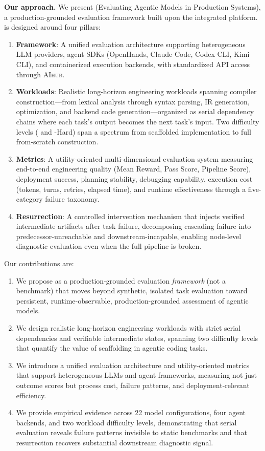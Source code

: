 \textbf{Our approach.}
We present \eva{} (Evaluating Agentic Models in Production Systems), a production-grounded evaluation framework built upon the \yatcc{} integrated platform.
\eva{} is designed around four pillars:
\begin{enumerate}[nosep]
\item \textbf{Framework}: A unified evaluation architecture supporting heterogeneous LLM providers, agent SDKs (OpenHands, Claude Code, Codex CLI, Kimi CLI), and containerized execution backends, with standardized API access through \textsc{AIhub}.
\item \textbf{Workloads}: Realistic long-horizon engineering workloads spanning compiler construction---from lexical analysis through syntax parsing, IR generation, optimization, and backend code generation---organized as serial dependency chains where each task's output becomes the next task's input. Two difficulty levels (\yatcc{} and \yatcc{}-Hard) span a spectrum from scaffolded implementation to full from-scratch construction.
\item \textbf{Metrics}: A utility-oriented multi-dimensional evaluation system measuring end-to-end engineering quality (Mean Reward, Pass Score, Pipeline Score), deployment success, planning stability, debugging capability, execution cost (tokens, turns, retries, elapsed time), and runtime effectiveness through a five-category failure taxonomy.
\item \textbf{Resurrection}: A controlled intervention mechanism that injects verified intermediate artifacts after task failure, decomposing cascading failure into predecessor-unreachable and downstream-incapable, enabling node-level diagnostic evaluation even when the full pipeline is broken.
\end{enumerate}

Our contributions are:
\begin{enumerate}[nosep]
\item We propose \eva{} as a production-grounded evaluation \emph{framework} (not a benchmark) that moves beyond synthetic, isolated task evaluation toward persistent, runtime-observable, production-grounded assessment of agentic models.
\item We design realistic long-horizon engineering workloads with strict serial dependencies and verifiable intermediate states, spanning two difficulty levels that quantify the value of scaffolding in agentic coding tasks.
\item We introduce a unified evaluation architecture and utility-oriented metrics that support heterogeneous LLMs and agent frameworks, measuring not just outcome scores but process cost, failure patterns, and deployment-relevant efficiency.
\item We provide empirical evidence across 22 model configurations, four agent backends, and two workload difficulty levels, demonstrating that serial evaluation reveals failure patterns invisible to static benchmarks and that resurrection recovers substantial downstream diagnostic signal.
\end{enumerate}
